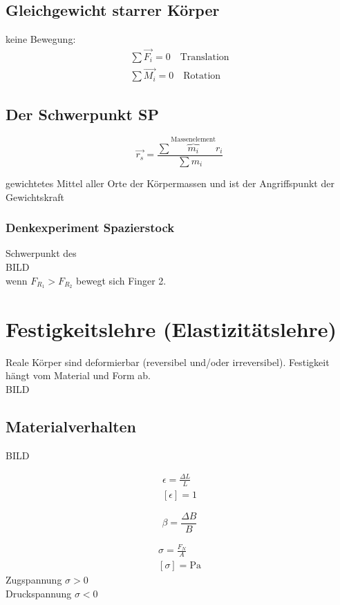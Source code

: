 \subsection{Gleichgewicht starrer Körper}
keine Bewegung:
\begin{gather*}
	\sum \vec{F_i} = 0 \quad \text{Translation} \\
	\sum \vec{M_i} = 0 \quad \text{Rotation}
\end{gather*}

\subsection{Der Schwerpunkt SP}
\begin{def*}[ note = Schwerpunkt , index = Schwerpunkt ]
	\[ \vec{r_s} = \frac{\sum \overbrace{m_i}^{\text{Massenelement}} r_i}{\sum m_i} \]
\end{def*}
gewichtetes  Mittel aller Orte der Körpermassen und ist der Angriffspunkt der Gewichtskraft

\subsubsection{Denkexperiment Spazierstock}
Schwerpunkt des \\
BILD \\
wenn $F_{R_1} > F_{R_2}$ bewegt sich Finger 2.

\section{Festigkeitslehre (Elastizitätslehre)}
Reale Körper sind deformierbar (reversibel und/oder irreversibel). Festigkeit hängt vom Material und Form ab. \\
BILD

\subsection{Materialverhalten}
BILD \\
\begin{def*}[ note = Dehnung , index = Dehnung ]
	\begin{gather*}
		\epsilon = \frac{\Delta L}{L} \\
		[ \epsilon ] = 1
	\end{gather*}
\end{def*}
\begin{def*}[ note = Querkontraktion , index = Querkontraktion ]
	\[ \beta = \frac{\Delta B}{B} \]
\end{def*}
\begin{def*}[ note = Normalspannung , index = Normalspannung ]
	\begin{gather*}
		\sigma = \frac{F_N}{A} \\
		[ \sigma ] = \text{Pa}
	\end{gather*}
	Zugspannung $\sigma > 0$ \\
	Druckspannung $\sigma < 0$
\end{def*}

